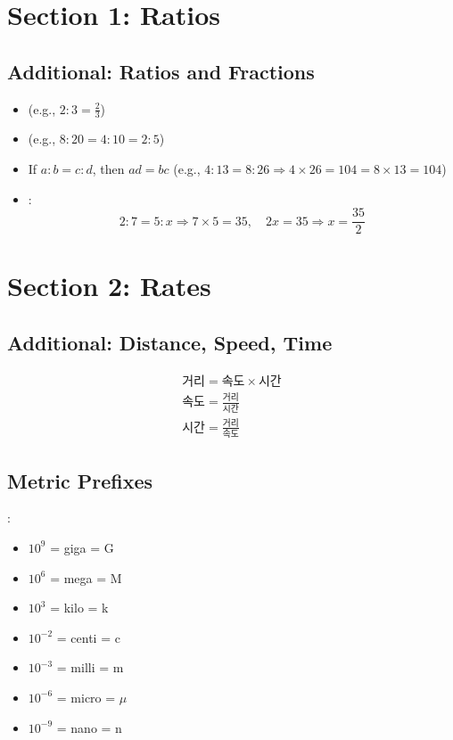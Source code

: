 
\section{Section 1: Ratios}

\subsection*{Additional: Ratios and Fractions}
\begin{itemize}
    \item {} (e.g., $2:3 = \frac{2}{3}$)
    \item {} (e.g., $8:20 = 4:10 = 2:5$)
    \item If $a:b = c:d$, then $ad = bc$ (e.g., $4:13 = 8:26 \Rightarrow 4 \times 26 = 104 = 8 \times 13 = 104$)
    \item {}:
    \[
    2:7 = 5:x \Rightarrow 7 \times 5 = 35,\quad 2x = 35 \Rightarrow x = \frac{35}{2}
    \]
\end{itemize}

\section{Section 2: Rates}

\subsection*{Additional: Distance, Speed, Time}

\[
\begin{array}{c}
\text{거리} = \text{속도} \times \text{시간} \\
\text{속도} = \frac{\text{거리}}{\text{시간}} \\
\text{시간} = \frac{\text{거리}}{\text{속도}}
\end{array}
\]

\subsection*{Metric Prefixes}
:
\begin{itemize}
    \item $10^9$ = giga = G
    \item $10^6$ = mega = M
    \item $10^3$ = kilo = k
    \item $10^{-2}$ = centi = c
    \item $10^{-3}$ = milli = m
    \item $10^{-6}$ = micro = $\mu$
    \item $10^{-9}$ = nano = n
\end{itemize}

